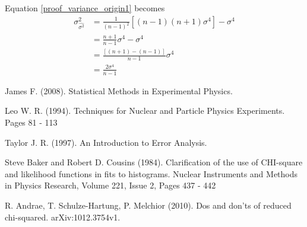 \documentclass[12pt,a4paper]{report}
\begin{document}
Equation \ref{proof_variance_origin1} becomes
\begin{align*}
\sigma_{\hat{\sigma^2}}^2
&= \frac{1}{(n-1)^2} [ (n-1)(n+1) \sigma^4 ] - \sigma^4 \\
&= \frac{n+1}{n-1} \sigma^4 - \sigma^4 \\
&= \frac{[(n+1)-(n-1)]}{n-1} \sigma^4 \\
&= \frac{2\sigma^4}{n-1}
\end{align*}

\medskip

\begin{thebibliography}{99}

James F. (2008). Statistical Methods in Experimental Physics.

Leo W. R. (1994). Techniques for Nuclear and Particle Physics Experiments. Pages 81 - 113

Taylor J. R. (1997). An Introduction to Error Analysis. 

Steve Baker and Robert D. Cousins (1984). Clarification of the use of CHI-square and likelihood functions in fits to histograms. Nuclear Instruments and Methods in Physics Research, Volume 221, Issue 2, Pages 437 - 442 

R. Andrae, T. Schulze-Hartung, P. Melchior (2010). Dos and don’ts of reduced chi-squared. arXiv:1012.3754v1. 

\end{thebibliography}
\end{document}

